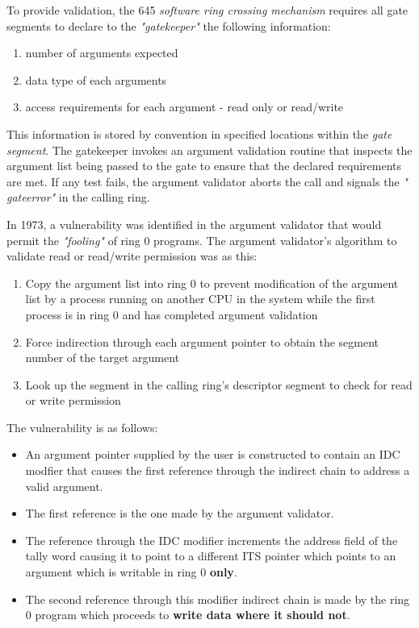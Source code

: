 To provide validation, the 645 \textit{software ring crossing mechanism} requires all gate segments to declare to 
the \textit{"gatekeeper"} the following information:
\begin{enumerate}
    \item number of arguments expected
    \item data type of each arguments
    \item access requirements for each argument - read only or read/write
\end{enumerate} 
This information is stored by convention in specified locations within the \textit{gate segment}. The gatekeeper 
invokes an argument validation routine that inspects the argument list being passed to the gate to ensure that the 
declared requirements are met. If any test fails, the argument validator aborts the call and signals the \textit{"
gate\textunderscore error"} in the calling ring.

In 1973, a vulnerability was identified in the argument validator that would permit the \textit{"fooling"} of ring 0 
programs.
The argument validator's algorithm to validate read or read/write permission was as this:
\begin{enumerate}
    \item Copy the argument list into ring 0 to prevent modification of the argument list by a process 
    running on another CPU in the system while the first process is in ring 0 and has completed argument validation
    \item Force indirection through each argument pointer to obtain the segment number of the target argument
    \item Look up the segment in the calling ring's descriptor segment to check for read or write permission
\end{enumerate}

The vulnerability is as follows:
\begin{itemize}
    \item An argument pointer supplied by the user is constructed to contain an IDC modfier that causes the first 
    reference through the indirect chain to address a valid argument.
    \item The first reference is the one made by the argument validator.
    \item The reference through the IDC modifier increments the address field of the tally word causing it to point 
    to a different ITS pointer which points to an argument which is writable in ring 0 \textbf{only}.
    \item The second reference through this modifier indirect chain is made by the ring 0 program which proceeds 
    to \textbf{write data where it should not}. 
\end{itemize}

